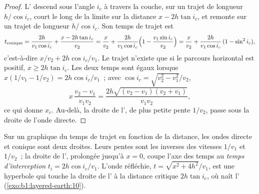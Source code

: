 \begin{proof}
L' descend sous l'angle $i_c$ à travers la couche, sur un trajet de
longueur $h/\cos i_c$, court le long de la limite sur la distance
$x - 2h\tan i_c$, et remonte sur un trajet de longueur $h/\cos i_c$. Son temps de
trajet est
\[
  t_{\text{conique}} = \frac{2h}{v_1\cos i_c} + \frac{x - 2h\tan i_c}{v_2}
  = \frac{x}{v_2} + \frac{2h}{v_1\cos i_c}\Bigl(1 - \frac{v_1\sin i_c}{v_2}\Bigr)
  = \frac{x}{v_2} + \frac{2h}{v_1\cos i_c}\,(1 - \sin^2 i_c),
\]
c'est-à-dire $x/v_2 + 2h\cos i_c/v_1$. Le trajet n'existe que si le parcours
horizontal est positif, $x \ge 2h\tan i_c$. Les deux temps sont égaux lorsque
$x(1/v_1 - 1/v_2) = 2h\cos i_c/v_1$~; avec $\cos i_c = \sqrt{v_2^2 - v_1^2}/v_2$,
\[
  x\,\frac{v_2 - v_1}{v_1 v_2} = \frac{2h\sqrt{(v_2 - v_1)(v_2 + v_1)}}{v_1 v_2},
\]
ce qui donne $x_c$. Au-delà, la droite de l', de plus petite pente
$1/v_2$, passe sous la droite de l'onde directe.
\end{proof}

Sur un graphique du temps de trajet en fonction de la distance, les ondes directe
et conique sont deux droites. Leurs pentes sont les inverses des vitesses $1/v_1$
et $1/v_2$~; la droite de l', prolongée jusqu'à $x = 0$, coupe l'axe
des temps au \emph{temps d'interception} $t_i = 2h\cos i_c/v_1$. L'onde réfléchie,
$t = \sqrt{x^2 + 4h^2}/v_1$, est une hyperbole qui touche la droite de l' à la distance critique $2h\tan i_c$, où naît l'
(\cref{exo:b1:layered-earth:10}).

